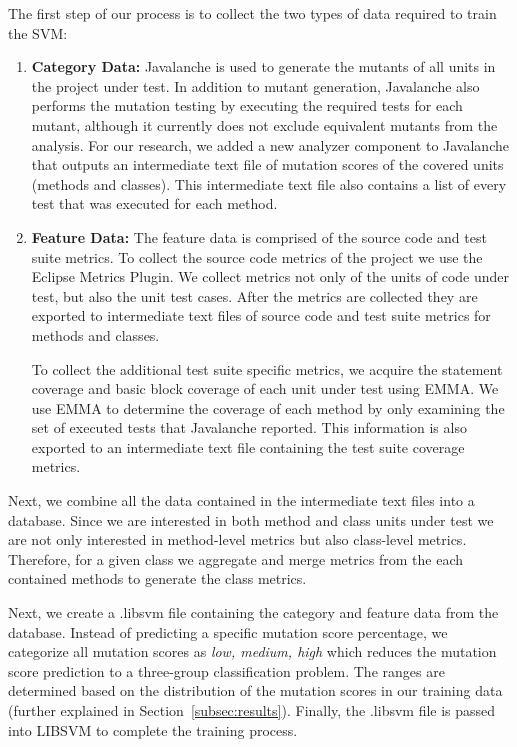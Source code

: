 \documentclass[conference]{IEEEtran}
\begin{document}
The first step of our process is to collect the two types of data required to train the SVM:

\begin{enumerate}
  \item \textbf{Category Data:} Javalanche is used to generate the mutants of all units in the project under test. In addition to mutant generation, Javalanche also performs the mutation testing by executing the required tests for each mutant, although it currently does not exclude equivalent mutants from the analysis. For our research, we added a new analyzer component to Javalanche that outputs an intermediate text file of mutation scores of the covered units (methods and classes). This intermediate text file also contains a list of every test that was executed for each method.

  \item \textbf{Feature Data:} The feature data is comprised of the source code and test suite metrics. To collect the source code metrics of the project we use the Eclipse Metrics Plugin. We collect metrics not only of the units of code under test, but also the unit test cases. After the metrics are collected they are exported to intermediate text files of source code and test suite metrics for methods and classes.

  To collect the additional test suite specific metrics, we acquire the statement coverage and basic block coverage of each unit under test using EMMA. We use EMMA to determine the coverage of each method by only examining the set of executed tests that Javalanche reported. This information is also exported to an intermediate text file containing the test suite coverage metrics.
\end{enumerate}

Next, we combine all the data contained in the intermediate text files into a database. Since we are interested in both method and class units under test we are not only interested in method-level metrics but also class-level metrics. Therefore, for a given class we aggregate and merge metrics from the each contained methods to generate the class metrics.

Next, we create a .libsvm file containing the category and feature data from the database. Instead of predicting a specific mutation score percentage, we categorize all mutation scores as \textit{low, medium, high} which reduces the mutation score prediction to a three-group classification problem. The ranges are determined based on the distribution of the mutation scores in our training data (further explained in Section~\ref{subsec:results}). Finally, the .libsvm file is passed into LIBSVM to complete the training process.
\end{document}
